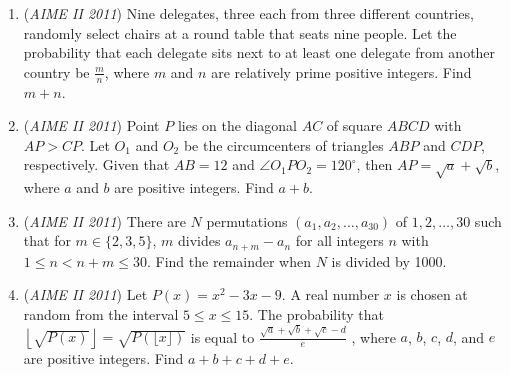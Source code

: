 \begin{enumerate}
 

	\item (\textit{AIME II 2011}) Nine delegates, three each from three different countries, randomly select chairs at a round table that seats nine people. Let the probability that each delegate sits next to at least one delegate from another country be $\frac{m}{n}$, where $m$ and $n$ are relatively prime positive integers. Find $m + n$.


 

	\item (\textit{AIME II 2011}) Point $P$ lies on the diagonal $AC$ of square $ABCD$ with $AP > CP$. Let $O_1$ and $O_2$ be the circumcenters of triangles $ABP$ and $CDP$, respectively. Given that $AB = 12$ and $\angle O_1PO_2 = 120 ^{\circ}$, then $AP = \sqrt{a} + \sqrt{b}$, where $a$ and $b$ are positive integers. Find $a + b$.


 

	\item (\textit{AIME II 2011}) There are $N$ permutations $(a_1, a_2, \dots, a_{30})$ of $1, 2, \dots, 30$ such that for $m \in \{2,3,5\}$, $m$ divides $a_{n+m} - a_n$ for all integers $n$ with $1 \le n < n+m \le 30$. Find the remainder when $N$ is divided by 1000.


 

	\item (\textit{AIME II 2011}) Let $P(x) = x^2 - 3x - 9$. A real number $x$ is chosen at random from the interval $5 \le x \le 15$. The probability that $\left\lfloor\sqrt{P(x)}\right\rfloor = \sqrt{P(\lfloor x \rfloor)}$ is equal to $\frac{\sqrt{a} + \sqrt{b} + \sqrt{c} - d}{e}$ , where $a$, $b$, $c$, $d$, and $e$ are positive integers. Find $a + b + c + d + e$.


 

\end{enumerate}